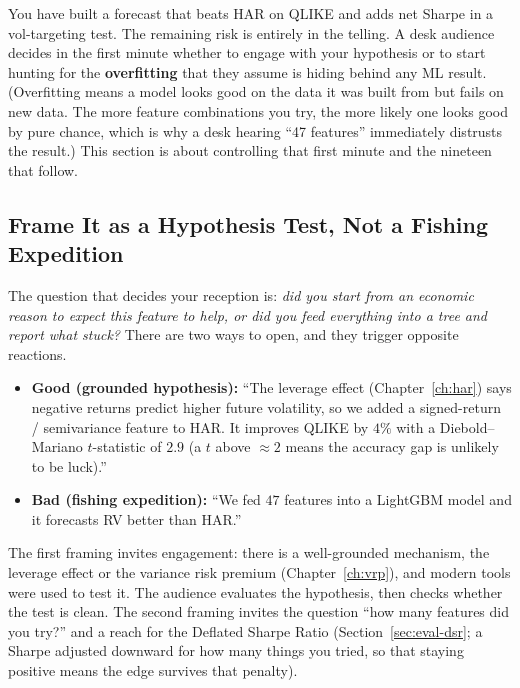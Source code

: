 You have built a forecast that beats HAR on QLIKE and adds net Sharpe in a vol-targeting test. The remaining risk is entirely in the telling. A desk audience decides in the first minute whether to engage with your hypothesis or to start hunting for the \textbf{overfitting} that they assume is hiding behind any ML result. (Overfitting means a model looks good on the data it was built from but fails on new data. The more feature combinations you try, the more likely one looks good by pure chance, which is why a desk hearing ``47 features'' immediately distrusts the result.) This section is about controlling that first minute and the nineteen that follow.

\subsection{Frame It as a Hypothesis Test, Not a Fishing Expedition}
\label{subsec:framing}

The question that decides your reception is: \emph{did you start from an economic reason to expect this feature to help, or did you feed everything into a tree and report what stuck?} There are two ways to open, and they trigger opposite reactions.

\begin{itemize}[leftmargin=1.5em]
  \item \textbf{Good (grounded hypothesis):} ``The leverage effect (Chapter~\ref{ch:har}) says negative returns predict higher future volatility, so we added a signed-return / semivariance feature to HAR. It improves QLIKE by $4\%$ with a Diebold--Mariano $t$-statistic of $2.9$ (a $t$ above $\approx 2$ means the accuracy gap is unlikely to be luck).''
  \item \textbf{Bad (fishing expedition):} ``We fed $47$ features into a LightGBM model and it forecasts RV better than HAR.''
\end{itemize}

The first framing invites engagement: there is a well-grounded mechanism, the leverage effect or the variance risk premium (Chapter~\ref{ch:vrp}), and modern tools were used to test it. The audience evaluates the hypothesis, then checks whether the test is clean. The second framing invites the question ``how many features did you try?'' and a reach for the Deflated Sharpe Ratio (Section~\ref{sec:eval-dsr}; a Sharpe adjusted downward for how many things you tried, so that staying positive means the edge survives that penalty).

